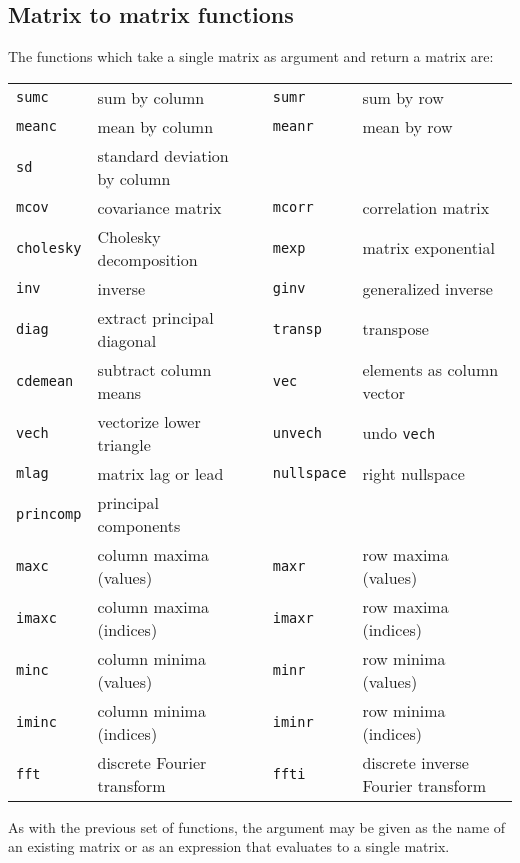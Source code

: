 \subsection{Matrix to matrix functions}
\label{matrix-to-matrix}

The functions which take a single matrix as argument and return a
matrix are:

\begin{center}
\begin{tabular}{llcll}
\texttt{sumc}     & sum by column & &
\texttt{sumr}     & sum by row \\
\texttt{meanc}    & mean by column & &
\texttt{meanr}    & mean by row \\
\texttt{sd}       & standard deviation by column \\
\texttt{mcov}     & covariance matrix & &
\texttt{mcorr}    & correlation matrix \\
\texttt{cholesky} & Cholesky decomposition & &
\texttt{mexp}     & matrix exponential \\
\texttt{inv}      & inverse & &
\texttt{ginv}     & generalized inverse \\
\texttt{diag}     & extract principal diagonal  & &
\texttt{transp}   & transpose \\
\texttt{cdemean}  & subtract column means & &
\texttt{vec}      & elements as column vector \\
\texttt{vech}     & vectorize lower triangle & &
\texttt{unvech}   & undo \texttt{vech} \\
\texttt{mlag}     & matrix lag or lead & &
\texttt{nullspace} & right nullspace \\
\texttt{princomp} & principal components \\
\texttt{maxc}     & column maxima (values) & &
\texttt{maxr}     & row maxima (values) \\
\texttt{imaxc}    & column maxima (indices) & &
\texttt{imaxr}    & row maxima (indices) \\
\texttt{minc}     & column minima (values) & &
\texttt{minr}     & row minima (values) \\
\texttt{iminc}    & column minima (indices) & &
\texttt{iminr}    & row minima (indices) \\
\texttt{fft}      & discrete Fourier transform & &
\texttt{ffti}     & discrete inverse Fourier transform 
\end{tabular}
\end{center}

As with the previous set of functions, the argument may be given as
the name of an existing matrix or as an expression that evaluates to a
single matrix.

